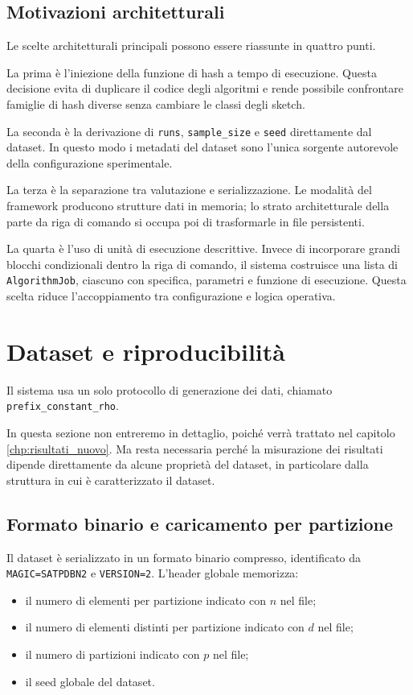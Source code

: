 \subsection{Motivazioni architetturali}

Le scelte architetturali principali possono essere riassunte in quattro punti.

La prima è l'iniezione della funzione di hash a tempo di esecuzione. Questa decisione evita
di duplicare il codice degli algoritmi e rende possibile confrontare famiglie di
hash diverse senza cambiare le classi degli sketch.

La seconda è la derivazione di \texttt{runs}, \texttt{sample\_size} e
\texttt{seed} direttamente dal dataset. In questo modo i metadati del dataset
sono l'unica sorgente autorevole della configurazione sperimentale.

La terza è la separazione tra valutazione e serializzazione. Le modalità del
framework producono strutture dati in memoria; lo strato architetturale della parte da riga di comando si
occupa poi di trasformarle in file persistenti.

La quarta è l'uso di unità di esecuzione descrittive. Invece di incorporare grandi blocchi
condizionali dentro la riga di comando, il sistema costruisce una lista di
\texttt{AlgorithmJob},
ciascuno con specifica, parametri e funzione di esecuzione. Questa scelta
riduce l'accoppiamento tra configurazione e logica operativa.

\section{Dataset e riproducibilità}
Il sistema usa un solo protocollo di generazione dei dati, chiamato
\texttt{prefix\_constant\_rho}. 

In questa sezione non entreremo in dettaglio, poich\'e verr\`a trattato
nel capitolo \ref{chp:risultati_nuovo}.
Ma resta necessaria perché la misurazione dei risultati dipende direttamente da alcune
proprietà del dataset, in particolare dalla struttura in cui \`e caratterizzato il dataset.

\subsection{Formato binario e caricamento per partizione}

Il dataset è serializzato in un formato binario compresso, identificato da
\texttt{MAGIC=SATPDBN2} e \texttt{VERSION=2}. L'header globale memorizza:
\begin{itemize}
    \item il numero di elementi per partizione indicato con \(n\) nel file;
    \item il numero di elementi distinti per partizione indicato con \(d\) nel file;
    \item il numero di partizioni indicato con \(p\) nel file;
    \item il seed globale del dataset.
\end{itemize}


